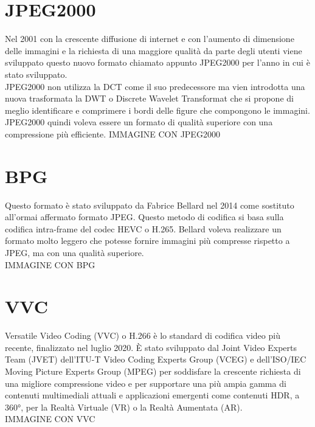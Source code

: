 \section{JPEG2000}
Nel 2001 con la crescente diffusione di internet e con l’aumento di dimensione delle immagini e la richiesta di una maggiore qualità da parte degli utenti viene sviluppato questo nuovo formato chiamato appunto JPEG2000 per l’anno in cui è stato sviluppato.\\
JPEG2000 non utilizza la DCT come il suo predecessore ma vien introdotta una nuova trasformata la DWT o Discrete Wavelet Transformat che si propone di meglio identificare e comprimere i bordi delle figure che compongono le immagini. JPEG2000 quindi voleva essere un formato di qualità superiore con una compressione più efficiente. \cite{952804}
IMMAGINE CON JPEG2000

\section{BPG}
Questo formato è stato sviluppato da Fabrice Bellard nel 2014 come sostituto all’ormai affermato formato JPEG. Questo metodo di codifica si basa sulla codifica intra-frame del codec HEVC o H.265. \cite{BPGImageformat} Bellard voleva realizzare un formato molto leggero che potesse fornire immagini più compresse rispetto a JPEG, ma con una qualità superiore.\\
IMMAGINE CON BPG

\section{VVC}
Versatile Video Coding (VVC) o H.266 è lo standard di codifica video più recente, finalizzato nel luglio 2020. È stato sviluppato dal Joint Video Experts Team (JVET) dell'ITU-T Video Coding Experts Group (VCEG) e dell'ISO/IEC Moving Picture Experts Group (MPEG) per soddisfare la crescente richiesta di una migliore compressione video e per supportare una più ampia gamma di contenuti multimediali attuali e applicazioni emergenti come contenuti HDR, a 360°, per la Realtà Virtuale (VR) o la Realtà Aumentata (AR).\cite{9503377}\\
IMMAGINE CON VVC

